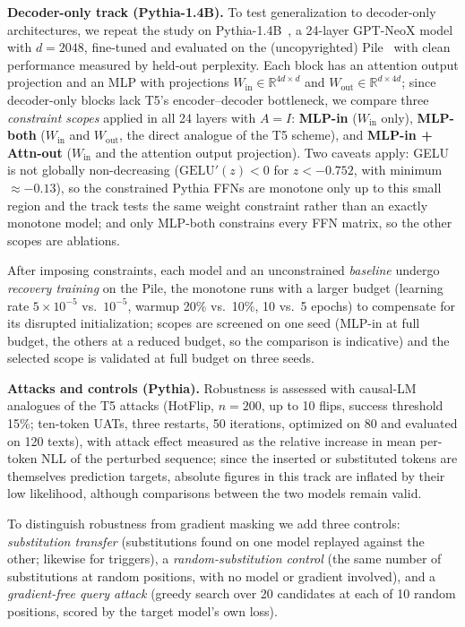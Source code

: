 \documentclass{article}
\theoremstyle{plain}
\theoremstyle{definition}
\theoremstyle{remark}
\theoremstyle{plain}
\begin{document}
\textbf{Decoder-only track (Pythia-1.4B).}
\label{sec:setup-pythia}
To test generalization to decoder-only architectures, we repeat the study on Pythia-1.4B~\citep{biderman2023pythia}, a 24-layer GPT-NeoX model with $d = 2048$, fine-tuned and evaluated on the (uncopyrighted) Pile~\citep{gao2020pile} with clean performance measured by held-out perplexity. Each block has an attention output projection and an MLP with projections $W_{\mathrm{in}} \in \mathbb{R}^{4d \times d}$ and $W_{\mathrm{out}} \in \mathbb{R}^{d \times 4d}$; since decoder-only blocks lack T5's encoder--decoder bottleneck, we compare three \emph{constraint scopes} applied in all 24 layers with $A = I$: \textbf{MLP-in} ($W_{\mathrm{in}}$ only), \textbf{MLP-both} ($W_{\mathrm{in}}$ and $W_{\mathrm{out}}$, the direct analogue of the T5 scheme), and \textbf{MLP-in + Attn-out} ($W_{\mathrm{in}}$ and the attention output projection). Two caveats apply: GELU is not globally non-decreasing ($\mathrm{GELU}'(z) < 0$ for $z < -0.752$, with minimum $\approx -0.13$), so the constrained Pythia FFNs are monotone only up to this small region and the track tests the same weight constraint rather than an exactly monotone model; and only MLP-both constrains every FFN matrix, so the other scopes are ablations.

After imposing constraints, each model and an unconstrained \emph{baseline} undergo \emph{recovery training} on the Pile, the monotone runs with a larger budget (learning rate $5\times 10^{-5}$ vs.\ $10^{-5}$, warmup 20\% vs.\ 10\%, 10 vs.\ 5 epochs) to compensate for its disrupted initialization; scopes are screened on one seed (MLP-in at full budget, the others at a reduced budget, so the comparison is indicative) and the selected scope is validated at full budget on three seeds.

\textbf{Attacks and controls (Pythia).}
Robustness is assessed with causal-LM analogues of the T5 attacks (HotFlip, $n = 200$, up to 10 flips, success threshold 15\%; ten-token UATs, three restarts, 50 iterations, optimized on 80 and evaluated on 120 texts), with attack effect measured as the relative increase in mean per-token NLL of the perturbed sequence; since the inserted or substituted tokens are themselves prediction targets, absolute figures in this track are inflated by their low likelihood, although comparisons between the two models remain valid.

To distinguish robustness from gradient masking we add three controls: \emph{substitution transfer} (substitutions found on one model replayed against the other; likewise for triggers), a \emph{random-substitution control} (the same number of substitutions at random positions, with no model or gradient involved), and a \emph{gradient-free query attack} (greedy search over 20 candidates at each of 10 random positions, scored by the target model's own loss).
\end{document}
